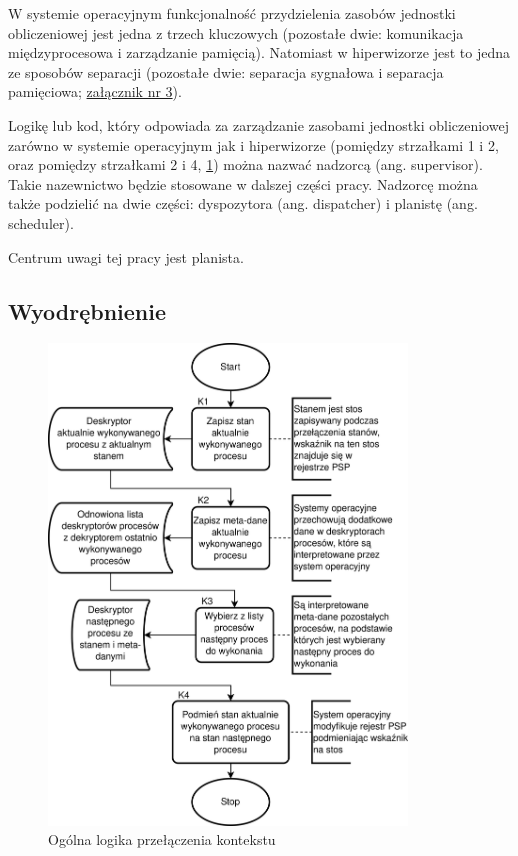 \documentclass[../../main]{subfiles}
\begin{document}
W systemie operacyjnym funkcjonalność przydzielenia zasobów jednostki obliczeniowej jest jedna z trzech kluczowych (pozostałe dwie: komunikacja międzyprocesowa i zarządzanie pamięcią). Natomiast w hiperwizorze jest to jedna ze sposobów separacji (pozostałe dwie: separacja sygnałowa i separacja pamięciowa; \hyperref[sec:zalacznik-3]{załącznik nr 3}).

Logikę lub kod, który odpowiada za zarządzanie zasobami jednostki obliczeniowej zarówno w systemie operacyjnym jak i hiperwizorze (pomiędzy strzałkami 1 i 2, oraz pomiędzy strzałkami 2 i 4, \cref{fig:armv8-m-context-switch}) można nazwać nadzorcą (ang. supervisor). Takie nazewnictwo będzie stosowane w dalszej części pracy. Nadzorcę można także podzielić na dwie części: dyspozytora (ang. dispatcher) i planistę (ang. scheduler).

Centrum uwagi tej pracy jest planista.

\subsection{Wyodrębnienie}
\begin{figure}[H]
    \centering
    \includegraphics[width=0.85\textwidth]{Images/context-switching-armv8-m.png}
    \caption{Ogólna logika przełączenia kontekstu}
    \label{fig:armv8-m-context-switch}
\end{figure}
\end{document}
